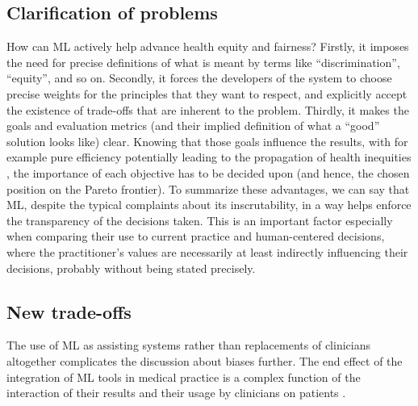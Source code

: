 \subsection{Clarification of problems}
How can ML actively help advance health equity and fairness?
Firstly, it imposes the need for precise definitions of what is meant by terms like ``discrimination'', ``equity'', and so on.
Secondly, it forces the developers of the system to choose precise weights for the principles that they want to respect, and explicitly accept the existence of trade-offs that are inherent to the problem.
Thirdly, it makes the goals and evaluation metrics (and their implied definition of what a ``good'' solution looks like) clear.
Knowing that those goals influence the results, with for example pure efficiency potentially leading to the propagation of health inequities \cite[p.~2]{Rajkomar2018}, the importance of each objective has to be decided upon (and hence, the chosen position on the Pareto frontier).
To summarize these advantages, we can say that ML, despite the typical complaints about its inscrutability, in a way helps enforce the transparency of the decisions taken.
This is an important factor especially when comparing their use to current practice and human-centered decisions, where the practitioner's values are necessarily at least indirectly influencing their decisions, probably without being stated precisely.

\subsection{New trade-offs}
The use of ML as assisting systems rather than replacements of clinicians altogether complicates the discussion about biases further.
The end effect of the integration of ML tools in medical practice is a complex function of the interaction of their results and their usage by clinicians on patients \cite[p.~4]{Rajkomar2018}.


